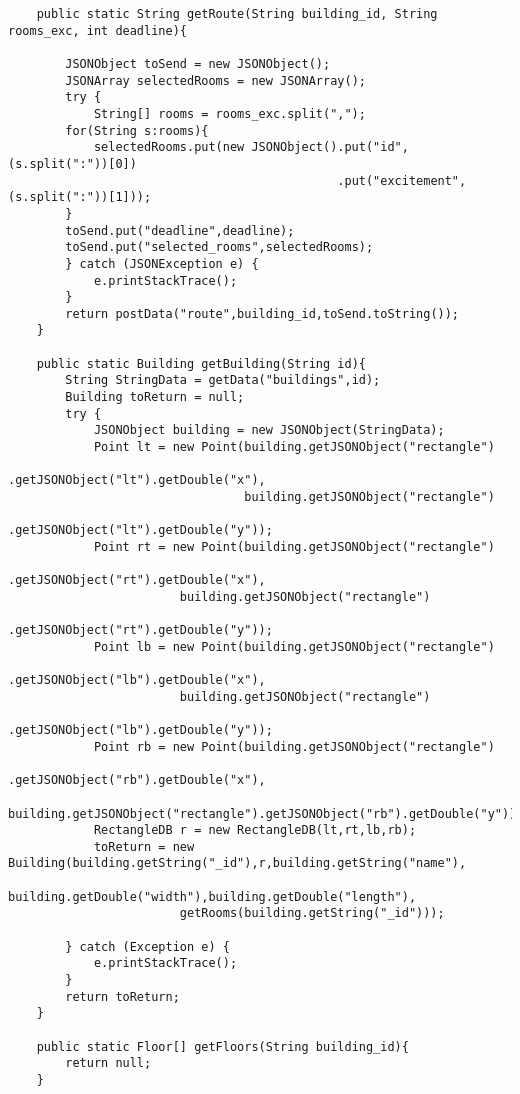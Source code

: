 \begin{lstlisting}
    public static String getRoute(String building_id, String rooms_exc, int deadline){

        JSONObject toSend = new JSONObject();
        JSONArray selectedRooms = new JSONArray();
        try {
            String[] rooms = rooms_exc.split(",");
        for(String s:rooms){
            selectedRooms.put(new JSONObject().put("id", (s.split(":"))[0])
                                              .put("excitement", (s.split(":"))[1]));
        }
        toSend.put("deadline",deadline);
        toSend.put("selected_rooms",selectedRooms);
        } catch (JSONException e) {
            e.printStackTrace();
        }
        return postData("route",building_id,toSend.toString());
    }

    public static Building getBuilding(String id){
        String StringData = getData("buildings",id);
        Building toReturn = null;
        try {
            JSONObject building = new JSONObject(StringData);
            Point lt = new Point(building.getJSONObject("rectangle")
                                         .getJSONObject("lt").getDouble("x"),
                                 building.getJSONObject("rectangle")
                                         .getJSONObject("lt").getDouble("y"));
            Point rt = new Point(building.getJSONObject("rectangle")
                                         .getJSONObject("rt").getDouble("x"),
                        building.getJSONObject("rectangle")
                                         .getJSONObject("rt").getDouble("y"));
            Point lb = new Point(building.getJSONObject("rectangle")
                                         .getJSONObject("lb").getDouble("x"),
                        building.getJSONObject("rectangle")
                                         .getJSONObject("lb").getDouble("y"));
            Point rb = new Point(building.getJSONObject("rectangle")
                                          .getJSONObject("rb").getDouble("x"),
                       building.getJSONObject("rectangle").getJSONObject("rb").getDouble("y"));
            RectangleDB r = new RectangleDB(lt,rt,lb,rb);
            toReturn = new Building(building.getString("_id"),r,building.getString("name"),
                        building.getDouble("width"),building.getDouble("length"),
                        getRooms(building.getString("_id")));

        } catch (Exception e) {
            e.printStackTrace();
        }
        return toReturn;
    }

    public static Floor[] getFloors(String building_id){
        return null;
    }


\end{lstlisting}
